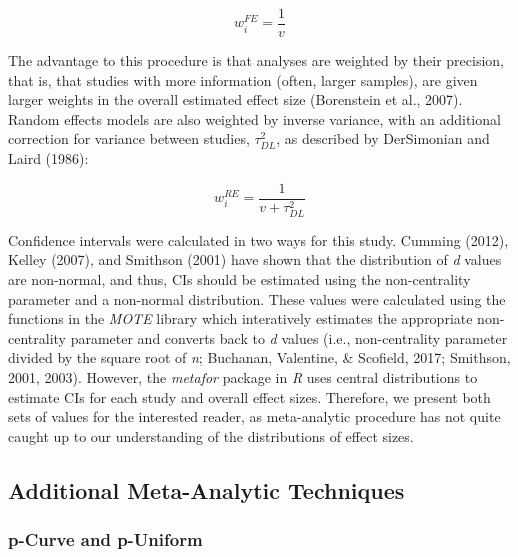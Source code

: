 \documentclass[english,man]{apa6}
\theoremstyle{definition}
\theoremstyle{definition}
\theoremstyle{definition}
\theoremstyle{remark}
\begin{document}
\[
w_{i}^{FE} = \frac {1} {v}
\]

The advantage to this procedure is that analyses are weighted by their
precision, that is, that studies with more information (often, larger
samples), are given larger weights in the overall estimated effect size
(Borenstein et al., 2007). Random effects models are also weighted by
inverse variance, with an additional correction for variance between
studies, \(\tau^2_{DL}\), as described by DerSimonian and Laird (1986):

\[
w_{i}^{RE} = \frac {1} {v + \tau^2_{DL}}
\]

Confidence intervals were calculated in two ways for this study. Cumming
(2012), Kelley (2007), and Smithson (2001) have shown that the
distribution of \emph{d} values are non-normal, and thus, CIs should be
estimated using the non-centrality parameter and a non-normal
distribution. These values were calculated using the functions in the
\emph{MOTE} library which interatively estimates the appropriate
non-centrality parameter and converts back to \emph{d} values (i.e.,
non-centrality parameter divided by the square root of \emph{n};
Buchanan, Valentine, \& Scofield, 2017; Smithson, 2001, 2003). However,
the \emph{metafor} package in \emph{R} uses central distributions to
estimate CIs for each study and overall effect sizes. Therefore, we
present both sets of values for the interested reader, as meta-analytic
procedure has not quite caught up to our understanding of the
distributions of effect sizes.

\subsection{Additional Meta-Analytic
Techniques}\label{additional-meta-analytic-techniques}

\subsubsection{p-Curve and p-Uniform}\label{p-curve-and-p-uniform}
\end{document}
